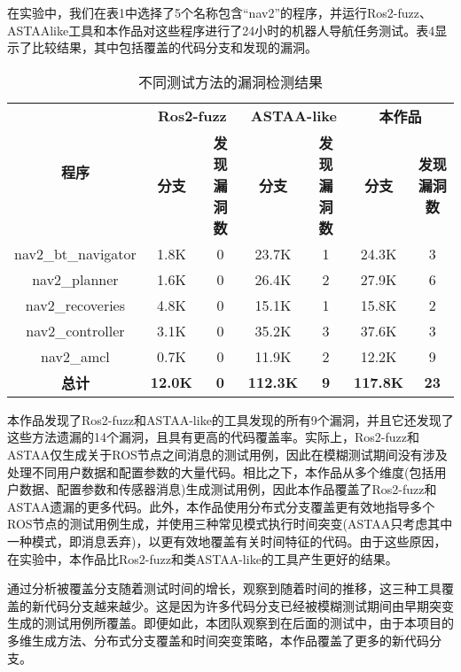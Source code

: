 在实验中，我们在表1中选择了5个名称包含``nav2''的程序，并运行Ros2-fuzz、ASTAAlike工具和本作品对这些程序进行了24小时的机器人导航任务测试。表4显示了比较结果，其中包括覆盖的代码分支和发现的漏洞。
\begin{table}[H]
	\small
	\caption{不同测试方法的漏洞检测结果}
	\centering
	\begin{tabular}{ccccccc}
		\hline
		\multirow{2}{*}{\textbf{程序}} & \multicolumn{2}{c}{\textbf{Ros2-fuzz}} & \multicolumn{2}{c}{\textbf{ASTAA-like}} & \multicolumn{2}{c}{\textbf{本作品}} \\
		\cline{2-7}
		& \textbf{分支} & \textbf{发现漏洞数} & \textbf{分支} & \textbf{发现漏洞数} & \textbf{分支} & \textbf{发现漏洞数} \\
		\hline
		nav2\_bt\_navigator & 1.8K & 0 & 23.7K & 1 & 24.3K & 3 \\
		nav2\_planner & 1.6K & 0 & 26.4K & 2 & 27.9K & 6 \\
		nav2\_recoveries & 4.8K & 0 & 15.1K & 1 & 15.8K & 2 \\
		nav2\_controller & 3.1K & 0 & 35.2K & 3 & 37.6K & 3 \\
		nav2\_amcl & 0.7K & 0 & 11.9K & 2 & 12.2K & 9 \\
		\textbf{总计} & \textbf{12.0K} & \textbf{0} & \textbf{112.3K} & \textbf{9} & \textbf{117.8K} & \textbf{23} \\
		\hline
	\end{tabular}
\end{table}
本作品发现了Ros2-fuzz和ASTAA-like的工具发现的所有9个漏洞，并且它还发现了这些方法遗漏的14个漏洞，且具有更高的代码覆盖率。实际上，Ros2-fuzz和ASTAA仅生成关于ROS节点之间消息的测试用例，因此在模糊测试期间没有涉及处理不同用户数据和配置参数的大量代码。相比之下，本作品从多个维度(包括用户数据、配置参数和传感器消息)生成测试用例，因此本作品覆盖了Ros2-fuzz和ASTAA遗漏的更多代码。此外，本作品使用分布式分支覆盖更有效地指导多个ROS节点的测试用例生成，并使用三种常见模式执行时间突变(ASTAA只考虑其中一种模式，即消息丢弃)，以更有效地覆盖有关时间特征的代码。由于这些原因，在实验中，本作品比Ros2-fuzz和类ASTAA-like的工具产生更好的结果。

通过分析被覆盖分支随着测试时间的增长，观察到随着时间的推移，这三种工具覆盖的新代码分支越来越少。这是因为许多代码分支已经被模糊测试期间由早期突变生成的测试用例所覆盖。即便如此，本团队观察到在后面的测试中，由于本项目的多维生成方法、分布式分支覆盖和时间突变策略，本作品覆盖了更多的新代码分支。

